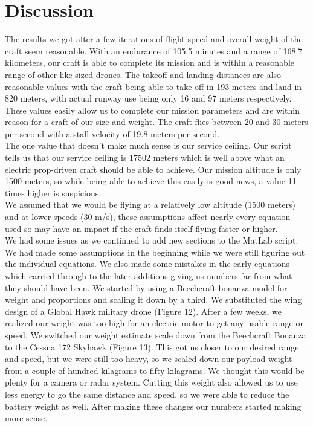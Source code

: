 \documentclass[12pt,A4paper]{article}
\begin{document}
	\section{Discussion}
	 \hspace{.15 in}The results we got after a few iterations of flight speed and overall weight of the craft seem reasonable. With an endurance of 105.5 minutes and a range of 168.7 kilometers, our craft is able to complete its mission and is within a reasonable range of other like-sized drones. The takeoff and landing distances are also reasonable values with the craft being able to take off in 193 meters and land in 820 meters, with actual runway use being only 16 and 97 meters respectively. These values easily allow us to complete our mission parameters and are within reason for a craft of our size and weight. The craft flies between 20 and 30 meters per second with a stall velocity of 19.8 meters per second. \\
	\indent The one value that doesn’t make much sense is our service ceiling. Our script tells us that our service ceiling is 17502 meters which is well above what an electric prop-driven craft should be able to achieve. Our mission altitude is only 1500 meters, so while being able to achieve this easily is good news, a value 11 times higher is suspicious. \\
	\indent We assumed that we would be flying at a relatively low altitude (1500 meters) and at lower speeds (30 m/s), these assumptions affect nearly every equation used so may have an impact if the craft finds itself flying faster or higher. \\
	\indent We had some issues as we continued to add new sections to the MatLab script. We had made some assumptions in the beginning while we were still figuring out the individual equations. We also made some mistakes in the early equations which carried through to the later additions giving us numbers far from what they should have been. 
	We started by using a Beechcraft bonanza model for weight and proportions and scaling it down by a third. We substituted the wing design of a Global Hawk military drone (Figure 12). After a few weeks, we realized our weight was too high for an electric motor to get any usable range or speed. We switched our weight estimate scale down from the Beechcraft Bonanza to the Cessna 172 Skyhawk (Figure 13). This got us closer to our desired range and speed, but we were still too heavy, so we scaled down our payload weight from a couple of hundred kilagrams to fifty kilagrams. We thought this would be plenty for a camera or radar system. Cutting this weight also allowed us to use less energy to go the same distance and speed, so we were able to reduce the battery weight as well. After making these changes our numbers started making more sense. 
	
\end{document}
